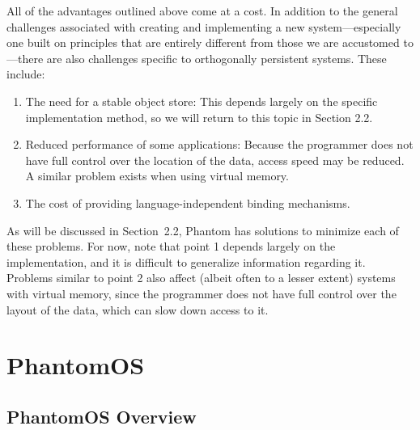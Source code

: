 All of the advantages outlined above come at a cost. In addition to the general challenges associated with creating and implementing a new system—especially one built on principles that are entirely different from those we are accustomed to—there are also challenges specific to orthogonally persistent systems. These include:
\begin{enumerate}[label=\arabic*.]
    \item The need for a stable object store: This depends largely on the specific implementation method, so we will return to this topic in Section 2.2.
    \item Reduced performance of some applications: Because the programmer does not have full control over the location of the data, access speed may be reduced. A similar problem exists when using virtual memory.
    \item The cost of providing language-independent binding mechanisms.
\end{enumerate}
As will be discussed in Section~2.2, Phantom has solutions to minimize each of these problems. For now, note that point 1 depends largely on the implementation, and it is difficult to generalize information regarding it. Problems similar to point 2 also affect (albeit often to a lesser extent) systems with virtual memory, since the programmer does not have full control over the layout of the data, which can slow down access to it.

\section{PhantomOS}

\subsection{PhantomOS Overview}

